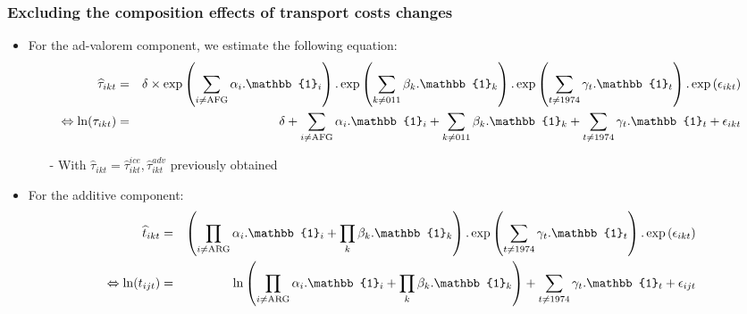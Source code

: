 \documentclass[10 pt,Helvetica, french]{beamer}
\begin{document}
\begin{frame}[label=app_compositioneffects]
\frametitle{Excluding the composition effects of transport costs changes}
\begin{itemize}
\item For the ad-valorem component, we estimate the following equation:
\scriptsize
\begin{eqnarray}
\widehat{\tau}_{ikt}&=&\delta\times \exp\left(\sum_{i \neq \text{AFG}}\alpha_i.\mathbb{1}_i\right).\exp\left(\sum_{k\neq \text{011}}\beta_k.\mathbb{1}_k\right).\exp\left(\sum_{t \neq 1974}\gamma_t.\mathbb{1}_t\right) .\exp\left(\epsilon_{ikt}\right) \notag \\
\Leftrightarrow \ln(\tau_{ikt})&=&\delta +\sum_{i \neq \text{AFG}}\alpha_i.\mathbb{1}_i + \sum_{k\neq \text{011}}\beta_k.\mathbb{1}_k + \sum_{t \neq 1974}\gamma_t.\mathbb{1}_t+\epsilon_{ikt} \label{eq:compeffects_mult}
\end{eqnarray}
\normalsize
\begin{itemize}
\item[-] With $\widehat{\tau}_{ikt} = \widehat{\tau}^{ice}_{ikt}, \widehat{\tau}^{adv}_{ikt}$ previously obtained  \vspace{0.1cm}
\end{itemize}
\item For the additive component:
\scriptsize
\begin{eqnarray}
\widehat{t}_{ikt}&=&\left( \prod_{i \neq \text{ARG}}  \alpha_i.\mathbb{1}_i+\prod_{k}\beta_k.\mathbb{1}_k\right).\exp\left(\sum_{t \neq 1974}\gamma_t.\mathbb{1}_t\right) .\exp\left(\epsilon_{ikt}\right) \notag \\
\Leftrightarrow \ln(t_{ijt})&=&\ln\left( \prod_{i \neq \text{ARG}}  \alpha_i.\mathbb{1}_i+\prod_{k}\beta_k.\mathbb{1}_k\right) + \sum_{t \neq 1974}\gamma_t.\mathbb{1}_t+\epsilon_{ijt} \label{eq:compeffects_add}
\end{eqnarray}
\normalsize
\end{itemize}

\end{frame}
\end{document}
